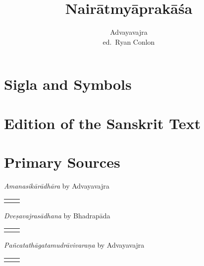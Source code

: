 \documentclass[12pt,twoside]{article}
\title{Nairātmyāprakāśa}
\author{Advayavajra \\ ed.\ Ryan Conlon}
\begin{document}
	\maketitle

\pagestyle{fancy}
\fancyhf{}
\fancyhead[LE,RO]{\thepage}

   \section{Sigla and Symbols}	
	

	\section{Edition of the Sanskrit Text}
	

%	

%	


	\EmbracOff

	\section*{Primary Sources}
\setlength{\LTpre}{0pt}
\setlength{\LTpost}{0pt}

\noindent\emph{Amanasikārādhāra} by Advayavajra
\noindent\begin{longtable}{ p{} p{} }
	& \cite[489–498]{mathes2015} 
\end{longtable}

\noindent\emph{Dveṣavajrasādhana} by Bhadrapāda
\noindent\begin{longtable}{ p{} p{} }
	& \cite[vol.\ 2 pp.\ 335–360]{gerloff2020} 
\end{longtable}

\noindent\emph{Pañcatathāgatamudrāvivaraṇa} by Advayavajra
\noindent\begin{longtable}{ p{} p{} }
	& \cite[371–384]{mathes2015} 
\end{longtable}
\end{document}
